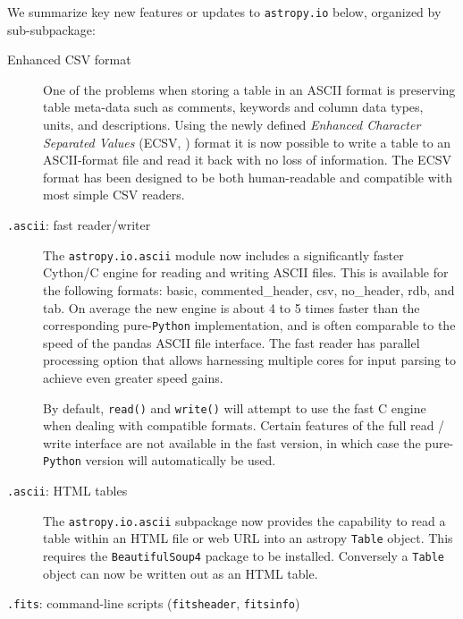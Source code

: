 \documentclass[modern]{aastex61}
\newcommand{\package}[1]{\texttt{#1}\xspace}
\newcommand{\python}{\package{Python}}
\begin{document}
We summarize key new features or updates to \package{astropy.io} below,
organized by sub-subpackage:
\begin{description}

    \item [Enhanced CSV format]

        One of the problems when storing a table in an ASCII format is
        preserving table meta-data such as comments, keywords and column data
        types, units, and descriptions. Using the newly defined \emph{Enhanced
        Character Separated Values} (ECSV,  \citet{ape6}) format it is now
        possible to write a table to an ASCII-format file and read it back
        with no loss of information. The ECSV format has been designed to be
        both human-readable and compatible with most simple CSV readers.

    \item[\texttt{.ascii}: fast reader/writer]

        The \package{astropy.io.ascii} module now includes a significantly faster
        Cython/C engine for reading and writing ASCII files. This is available
        for the following formats: basic, commented\_header, csv, no\_header,
        rdb, and tab.  On average the new engine is about 4 to 5 times faster
        than the corresponding pure-\python implementation, and is often
        comparable to the speed of the pandas ASCII file interface. The fast
        reader has parallel processing option that allows harnessing multiple
        cores for input parsing to achieve even greater speed gains.

        By default, \texttt{read()} and \texttt{write()} will attempt to use
        the fast C engine when dealing with compatible formats. Certain
        features of the full read / write interface are not available in the
        fast version, in which case the pure-\python version will automatically
        be used.

    \item[\texttt{.ascii}: HTML tables]

        The \package{astropy.io.ascii} subpackage now provides the capability
        to read a table within an HTML file or web URL into an astropy
        \texttt{Table} object. This requires the \package{BeautifulSoup4}
        package to be installed.  Conversely a \texttt{Table} object can now
        be written out as an HTML table.

    \item [\texttt{.fits}: command-line scripts (\texttt{fitsheader}, \texttt{fitsinfo})]


\end{description}
\end{document}
